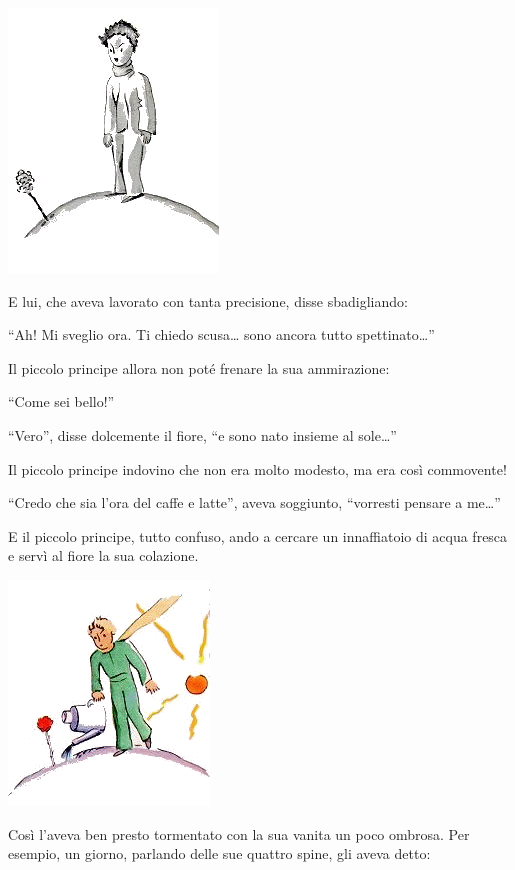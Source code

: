 \documentclass[11pt]{scrbook}
\begin{document}
\begin{center}
\includegraphics{img/8a}
\end{center}

E lui, che aveva lavorato con tanta precisione, disse sbadigliando:

``Ah! Mi sveglio ora. Ti chiedo scusa\ldots{} sono ancora tutto spettinato\ldots{}''

Il piccolo principe allora non poté frenare la sua ammirazione:

``Come sei bello!''

``Vero'', disse dolcemente il fiore, ``e sono nato insieme al sole\ldots{}''

Il piccolo principe indovino che non era molto modesto, ma era così commovente!

``Credo che sia l'ora del caffe e latte'', aveva soggiunto, ``vorresti pensare a me\ldots{}''

E il piccolo principe, tutto confuso, ando a cercare un innaffiatoio di acqua fresca e servì al fiore la sua colazione.

\begin{center}
\includegraphics{img/8b}
\end{center}

Così l'aveva ben presto tormentato con la sua vanita un poco ombrosa. Per esempio, un giorno, parlando delle sue quattro spine, gli aveva detto:
\end{document}
